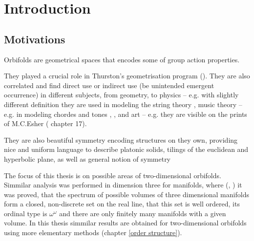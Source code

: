 \chapter{Introduction}
\setcounter{page}{9}
\section{Motivations}
Orbifolds are geometrical spaces that encodes some of group action properties. 

They played a crucial role in Thurston's geometrisation program (\cite{Thurston1979}). 
They are also correlated and find direct use or indirect use (be unintended 
emergent occurrence) 
in different subjects, 
from geometry, to 
physics -- e.g. with slightly different definition they are used in modeling the string theory 
\cite{Francesco}, 
 music theory -- e.g. 
in modeling chordes and tones 
\cite{Mazzola2002}, \cite{Tymoczko2006}, and art -- e.g. 
they are visible 
on the prints of M.C.Esher (\cite{Conway2016} chapter 17).  

They are also beautiful symmetry encoding structures on they own, providing 
nice 
and uniform language to describe platonic solids, tilings of the euclidean 
and hyperbolic plane, 
as well as general notion of symmetry

The focus of this thesis is on possible areas of two-dimensional orbifolds.
Simmilar analysis was performed in dimension three for manifolds, where 
(\cite{Thurston1979}, \cite{Gromov1981}) it was proved, that the spectrum of possible volumes 
of three dimensional manifolds form a closed, non-discrete set on the real line, 
that this set is well ordered, its ordinal type is $\omega^\omega$ and there are 
only finitely many manifolds with a given volume. 
In this thesis
simmilar results 
are obtained 
for two-dimensional orbifolds 
using more elementary methods
(chapter \ref{order structure}). 

